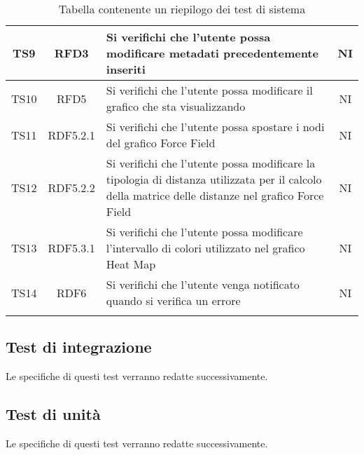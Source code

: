 \documentclass[../piano_di_qualifica.tex]{subfiles}
\begin{document}
\begin{center}
\begin{longtable}{|c|c|p{8.5cm}|c|}
		TS9                              & RFD3                   & Si verifichi che l'utente possa modificare metadati precedentemente inseriti                                      & NI                         \\ \hline
		TS10                             & RFD5                   & Si verifichi che l'utente possa modificare il grafico che sta visualizzando                                       & NI                         \\ \hline
		TS11                             & RDF5.2.1               & Si verifichi che l'utente possa spostare i nodi del grafico Force Field                                           & NI                         \\ \hline
		TS12                             & RDF5.2.2               & Si verifichi che l'utente possa modificare la tipologia di distanza utilizzata per il calcolo della matrice delle
		distanze nel grafico Force Field & NI                                                                                                                                                                      \\ \hline
		TS13                             & RDF5.3.1               & Si verifichi che l'utente possa modificare l'intervallo di colori utilizzato nel grafico Heat Map                 & NI                         \\ \hline
		TS14                             & RDF6                   & Si verifichi che l'utente venga notificato quando si verifica un errore                                           & NI                         \\
		\hline
		\rowcolor{white}
		\caption{Tabella contenente un riepilogo dei test di sistema}
	\end{longtable}

\end{center}


\subsection{Test di integrazione}%
\label{sub:test_int}
Le specifiche di questi test verranno redatte successivamente.

\subsection{Test di unità}%
\label{sub:test_unit}
Le specifiche di questi test verranno redatte successivamente.
\end{document}
